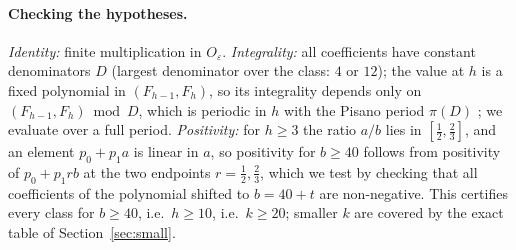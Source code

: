 \documentclass[11pt]{article}
\theoremstyle{definition}
\theoremstyle{remark}
\begin{document}
\paragraph{Checking the hypotheses.}
\emph{Identity:} finite multiplication in $O_\varepsilon$. \emph{Integrality:} all coefficients have constant denominators $D$ (largest denominator over the class: $4$ or $12$); the value at $h$ is a fixed polynomial in $(F_{h-1},F_h)$, so its integrality depends only on $(F_{h-1},F_h)\bmod D$, which is periodic in $h$ with the Pisano period $\pi(D)$ \cite{wall}; we evaluate over a full period. \emph{Positivity:} for $h\ge3$ the ratio $a/b$ lies in $[\tfrac12,\tfrac23]$, and an element $p_0+p_1a$ is linear in $a$, so positivity for $b\ge 40$ follows from positivity of $p_0+p_1rb$ at the two endpoints $r=\tfrac12,\tfrac23$, which we test by checking that all coefficients of the polynomial shifted to $b=40+t$ are non-negative. This certifies every class for $b\ge 40$, i.e.\ $h\ge 10$, i.e.\ $k\ge 20$; smaller $k$ are covered by the exact table of Section~\ref{sec:small}.
\end{document}
